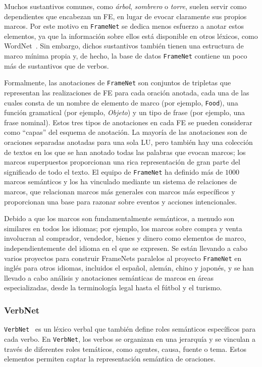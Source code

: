 Muchos sustantivos comunes, como \textit{árbol}, \textit{sombrero} o \textit{torre}, suelen servir como dependientes que encabezan un FE, en lugar de evocar claramente sus propios marcos.
Por este motivo en \texttt{FrameNet} se dedica menos esfuerzo a anotar estos elementos, ya que la información sobre ellos está disponible en otros léxicos, como WordNet~\cite{miller1998wordnet}.
Sin embargo, dichos sustantivos también tienen una estructura de marco mínima propia y, de hecho, la base de datos \texttt{FrameNet} contiene un poco más de sustantivos que de verbos.

Formalmente, las anotaciones de \texttt{FrameNet} son conjuntos de tripletas que representan las realizaciones de FE para cada oración anotada, cada una de las cuales consta de un nombre de elemento de marco (por ejemplo, \texttt{Food}), una función gramatical (por ejemplo, \textit{Objeto}) y un tipo de frase (por ejemplo, una frase nominal).
Estos tres tipos de anotaciones en cada FE se pueden considerar como ``capas'' del esquema de anotación.
La mayoría de las anotaciones son de oraciones separadas anotadas para una sola LU, pero también hay una colección de textos en los que se han anotado todas las palabras que evocan marcos; los marcos superpuestos proporcionan una rica representación de gran parte del significado de todo el texto.
El equipo de \texttt{FrameNet} ha definido más de $1000$ marcos semánticos y los ha vinculado mediante un sistema de relaciones de marcos, que relacionan marcos más generales con marcos más específicos y proporcionan una base para razonar sobre eventos y acciones intencionales.

Debido a que los marcos son fundamentalmente semánticos, a menudo son similares en todos los idiomas; por ejemplo, los marcos sobre compra y venta involucran al comprador, vendedor, bienes y dinero como elementos de marco, independientemente del idioma en el que se expresen.
Se están llevando a cabo varios proyectos para construir FrameNets paralelos al proyecto \texttt{FrameNet} en inglés para otros idiomas, incluidos el español, alemán, chino y japonés, y se han llevado a cabo análisis y anotaciones semánticas de marcos en áreas especializadas, desde la terminología legal hasta el fútbol y el turismo.

\subsubsection*{VerbNet}

\texttt{VerbNet}~\cite{verbnet} es un léxico verbal que también define roles semánticos específicos para cada verbo.
En \texttt{VerbNet}, los verbos se organizan en una jerarquía y se vinculan a través de diferentes roles temáticos, como agentes, causa, fuente o tema.
Estos elementos permiten captar la representación semántica de oraciones.

